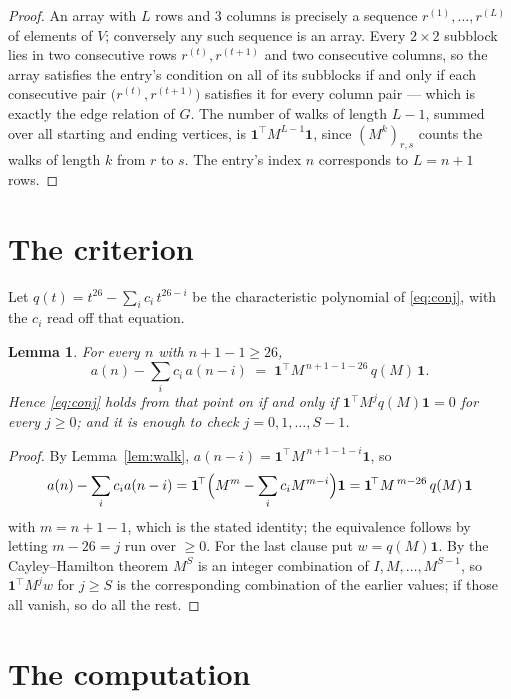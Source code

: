 \documentclass[11pt,a4paper]{article}
\theoremstyle{plain}
\newtheorem{lemma}[theorem]{Lemma}
\theoremstyle{definition}
\begin{document}
\begin{proof}
An array with $L$ rows and $3$ columns is precisely a sequence
$r^{(1)},\dots,r^{(L)}$ of elements of $V$; conversely any such sequence is an array.
Every $2\times2$ subblock lies in two consecutive rows $r^{(t)},r^{(t+1)}$ and two
consecutive columns, so the array satisfies the entry's condition on all of its subblocks
if and only if each consecutive pair $\bigl(r^{(t)},r^{(t+1)}\bigr)$ satisfies it for
every column pair --- which is exactly the edge relation of $G$. The number of walks of
length $L-1$, summed over all starting and ending vertices, is
$\mathbf{1}^{\!\top}M^{L-1}\mathbf{1}$, since $(M^{k})_{r,s}$ counts the walks of
length $k$ from $r$ to $s$. The entry's index $n$ corresponds to $L=n+1$ rows.
\end{proof}

\section{The criterion}

Let $q(t)=t^{26}-\sum_i c_i\,t^{26-i}$ be the characteristic polynomial of
\eqref{eq:conj}, with the $c_i$ read off that equation.

\begin{lemma}\label{lem:crit}
For every $n$ with $n+1-1\ge26$,
\[
a(n)-\sum_i c_i\,a(n-i)\;=\;\mathbf{1}^{\!\top}M^{\,n+1-1-26}\,q(M)\,\mathbf{1} .
\]
Hence \eqref{eq:conj} holds from that point on if and only if
$\mathbf{1}^{\!\top}M^{j}q(M)\mathbf{1}=0$ for every $j\ge0$; and it is enough to check
$j=0,1,\dots,S-1$.
\end{lemma}

\begin{proof}
By Lemma~\ref{lem:walk}, $a(n-i)=\mathbf{1}^{\!\top}M^{\,n+1-1-i}\mathbf{1}$, so
\[
a(n)-\sum_i c_i a(n-i)
=\mathbf{1}^{\!\top}\Bigl(M^{m}-\sum_i c_i M^{m-i}\Bigr)\mathbf{1}
=\mathbf{1}^{\!\top}M^{\,m-26}\,q(M)\,\mathbf{1}
\]
with $m=n+1-1$, which is the stated identity; the equivalence follows by letting
$m-26=j$ run over $\ge0$. For the last clause put $w=q(M)\mathbf{1}$. By the
Cayley--Hamilton theorem $M^{S}$ is an integer combination of $I,M,\dots,M^{S-1}$, so
$\mathbf{1}^{\!\top}M^{j}w$ for $j\ge S$ is the corresponding combination of the earlier
values; if those all vanish, so do all the rest.
\end{proof}

\section{The computation}
\end{document}
